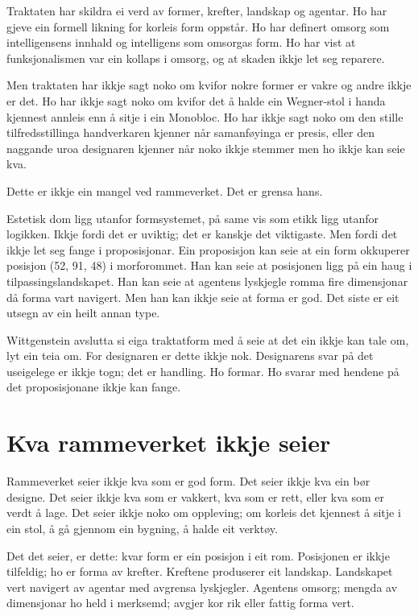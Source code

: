 

Traktaten har skildra ei verd av former, krefter, landskap og agentar. Ho har gjeve ein formell likning for korleis form oppstår. Ho har definert omsorg som intelligensens innhald og intelligens som omsorgas form. Ho har vist at funksjonalismen var ein kollaps i omsorg, og at skaden ikkje let seg reparere.

Men traktaten har ikkje sagt noko om kvifor nokre former er vakre og andre ikkje er det. Ho har ikkje sagt noko om kvifor det å halde ein Wegner-stol i handa kjennest annleis enn å sitje i ein Monobloc. Ho har ikkje sagt noko om den stille tilfredsstillinga handverkaren kjenner når samanføyinga er presis, eller den naggande uroa designaren kjenner når noko ikkje stemmer men ho ikkje kan seie kva.

Dette er ikkje ein mangel ved rammeverket. Det er grensa hans.

Estetisk dom ligg utanfor formsystemet, på same vis som etikk ligg utanfor logikken. Ikkje fordi det er uviktig; det er kanskje det viktigaste. Men fordi det ikkje let seg fange i proposisjonar. Ein proposisjon kan seie at ein form okkuperer posisjon (52, 91, 48) i morforommet. Han kan seie at posisjonen ligg på ein haug i tilpassingslandskapet. Han kan seie at agentens lyskjegle romma fire dimensjonar då forma vart navigert. Men han kan ikkje seie at forma er god. Det siste er eit utsegn av ein heilt annan type.

Wittgenstein avslutta si eiga traktatform med å seie at det ein ikkje kan tale om, lyt ein teia om. For designaren er dette ikkje nok. Designarens svar på det useigelege er ikkje togn; det er handling. Ho formar. Ho svarar med hendene på det proposisjonane ikkje kan fange.

\section*{Kva rammeverket ikkje seier}

Rammeverket seier ikkje kva som er god form. Det seier ikkje kva ein bør designe. Det seier ikkje kva som er vakkert, kva som er rett, eller kva som er verdt å lage. Det seier ikkje noko om oppleving; om korleis det kjennest å sitje i ein stol, å gå gjennom ein bygning, å halde eit verktøy.

Det det seier, er dette: kvar form er ein posisjon i eit rom. Posisjonen er ikkje tilfeldig; ho er forma av krefter. Kreftene produserer eit landskap. Landskapet vert navigert av agentar med avgrensa lyskjegler. Agentens omsorg; mengda av dimensjonar ho held i merksemd; avgjer kor rik eller fattig forma vert.

